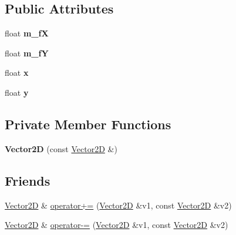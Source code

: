 \subsection*{Public Attributes}
\begin{DoxyCompactItemize}
\item 
\mbox{\label{class_vector2_d_a787efa5d25c51c4e88c258f004f1a26d}} 
float {\bfseries m\+\_\+fX}
\item 
\mbox{\label{class_vector2_d_aebc84c4485cf3f05154be6de89599f4c}} 
float {\bfseries m\+\_\+fY}
\item 
\mbox{\label{class_vector2_d_a3834968362d9205fcbddcf308b744ff2}} 
float {\bfseries x}
\item 
\mbox{\label{class_vector2_d_a866212102794ec86c9d547d9b0155033}} 
float {\bfseries y}
\end{DoxyCompactItemize}
\subsection*{Private Member Functions}
\begin{DoxyCompactItemize}
\item 
\mbox{\label{class_vector2_d_ad7aa6f850d32ae334ec2acffd272b63b}} 
{\bfseries Vector2D} (const \mbox{\hyperlink{class_vector2_d}{Vector2D}} \&)
\end{DoxyCompactItemize}
\subsection*{Friends}
\begin{DoxyCompactItemize}
\item 
\mbox{\hyperlink{class_vector2_d}{Vector2D}} \& \mbox{\hyperlink{class_vector2_d_a738ca24ea6760680730508dd1824b894}{operator+=}} (\mbox{\hyperlink{class_vector2_d}{Vector2D}} \&v1, const \mbox{\hyperlink{class_vector2_d}{Vector2D}} \&v2)
\item 
\mbox{\hyperlink{class_vector2_d}{Vector2D}} \& \mbox{\hyperlink{class_vector2_d_a9c4fa3260112a6179df34041de9a8ab2}{operator-\/=}} (\mbox{\hyperlink{class_vector2_d}{Vector2D}} \&v1, const \mbox{\hyperlink{class_vector2_d}{Vector2D}} \&v2)
\end{DoxyCompactItemize}


